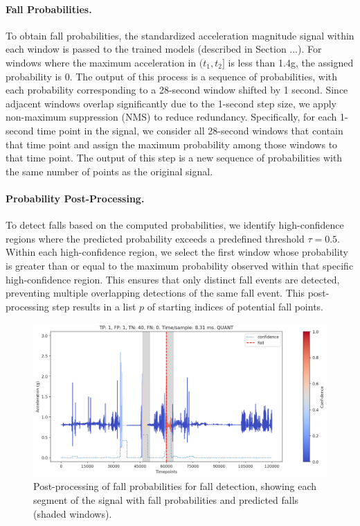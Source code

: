 \documentclass[runningheads]{llncs}
\begin{document}
\paragraph{Fall Probabilities.} To obtain fall probabilities, the standardized acceleration magnitude signal within each window is passed to the trained models (described in Section ...). For windows where the maximum acceleration in $(t_1, t_2]$ is less than 1.4g, the assigned probability is 0. The output of this process is a sequence of probabilities, with each probability corresponding to a 28-second window shifted by 1 second. Since adjacent windows overlap significantly due to the 1-second step size, we apply non-maximum suppression (NMS) to reduce redundancy. Specifically, for each 1-second time point in the signal, we consider all 28-second windows that contain that time point and assign the maximum probability among those windows to that time point. The output of this step is a new sequence of probabilities with the same number of points as the original signal.

\paragraph{Probability Post-Processing.} To detect falls based on the computed probabilities, we identify high-confidence regions where the predicted probability exceeds a predefined threshold $\tau = 0.5$.  Within each high-confidence region, we select the first window whose probability is greater than or equal to the maximum probability observed within that specific high-confidence region.  This ensures that only distinct fall events are detected, preventing multiple overlapping detections of the same fall event. This post-processing step results in a list $p$ of starting indices of potential fall points.

\begin{figure}[t]
\includegraphics[width=\textwidth]{img/detection_sample.pdf}
\caption{Post-processing of fall probabilities for fall detection, showing each segment of the signal with fall probabilities and predicted falls (shaded windows).} \label{fig:detection_sample}
\end{figure}
\end{document}

